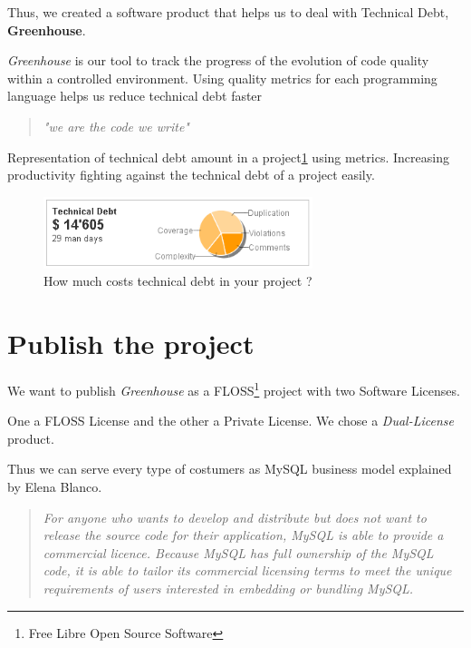 \documentclass[11pt]{scrartcl}
\begin{document}
\par Thus, we created a software product that helps us to deal with Technical Debt, \textbf{Greenhouse}.

\par \emph{Greenhouse} is our tool to track the progress of the evolution of code quality within a controlled environment. Using quality metrics for each programming language helps us reduce technical debt faster

\begin{quote}
    \begin{center}
    \emph{"we are the code we write"}
    \end{center}
\end{quote}

\par Representation of technical debt amount in a project\ref{tech-debt-costs} using metrics. Increasing productivity fighting against the technical debt of a project easily.

\begin{figure}[H]
\centering
\includegraphics[width=0.7\textwidth]{sonar_technical_debt.png}
\caption{How much costs technical debt in your project ?}
\label{tech-debt-costs}
\end{figure}

\section{Publish the project}
\label{sec:publish-project}

\par We want to publish \emph{Greenhouse} as a FLOSS\footnote{Free Libre Open Source Software} project with two Software Licenses.

\par One a FLOSS License and the other a Private License. We chose a \emph{Dual-License} product.

\par Thus we can serve every type of costumers as MySQL business model explained by Elena Blanco\cite{dl-business-model}.

\begin{quotation}
    \emph{For anyone who wants to develop and distribute but does not want to release the source code for their application, MySQL is able to provide a commercial licence. Because MySQL has full ownership of the MySQL code, it is able to tailor its commercial licensing terms to meet the unique requirements of users interested in embedding or bundling MySQL.}
\end{quotation}
\end{document}
